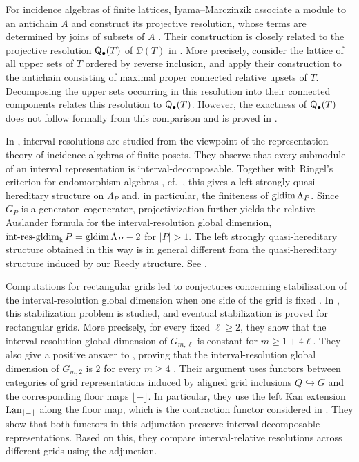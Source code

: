 For incidence algebras of finite lattices, Iyama--Marczinzik associate
a module to an antichain $A$ and construct its projective resolution,
whose terms are determined by joins of subsets of $A$
\cite[Theorem~2.2]{IM22}.
Their construction is closely related to the projective resolution
$\mathsf Q_\bullet(T)$ of $\DD(T)$ in
.
More precisely, consider the lattice of all upper sets of $T$ ordered
by reverse inclusion, and apply their construction to the
antichain consisting of maximal proper connected relative upsets of $T$.
Decomposing the upper sets occurring in this resolution into their
connected components relates this resolution to $\mathsf Q_\bullet(T)$.
However, the exactness of $\mathsf Q_\bullet(T)$ does not follow formally
from this comparison and is proved in
.


In \cite{AENY}, interval resolutions are studied from the viewpoint of
the representation theory of incidence algebras of finite posets.
They observe that every submodule of an interval representation
is interval-decomposable.  
Together with Ringel's criterion for endomorphism algebras
\cite{Ringel10}, cf.~\cite[Lemma~2.2]{Iyama03}, this gives a left
strongly quasi-hereditary structure on $\Lambda_P$ and, in particular,
the finiteness of $\operatorname{gldim}\Lambda_P$.  Since $G_P$ is a
generator--cogenerator, projectivization further yields
the relative Auslander formula for the interval-resolution global dimension,
$\operatorname{int\text{-}res\text{-}gldim}_{\mathsf{k}} P=\operatorname{gldim}\Lambda_P-2$ for $|P|>1$.
The left strongly quasi-hereditary structure obtained in this way is in
general different from the quasi-hereditary structure induced by our
Reedy structure.  See .


Computations for rectangular grids led to conjectures concerning stabilization of the interval-resolution global dimension when one side of the grid is fixed \cite[Conjectures~4.11 and~4.12]{AENY}.
In \cite{BDHS}, this stabilization problem is studied, and eventual stabilization is proved for rectangular
grids.  More precisely, for every fixed $\ell\geq2$, they show that the
interval-resolution global dimension of $G_{m,\ell}$ is constant for
$m\geq1+4\ell$.
They also give a positive answer to \cite[Conjecture~4.11]{AENY},
proving that the interval-resolution global dimension of $G_{m,2}$ 
is $2$ for every $m\geq4$ \cite[Corollary~D]{BDHS}.
Their argument uses functors between categories of grid representations
induced by aligned grid inclusions $Q\hookrightarrow G$ and the
corresponding floor maps $\lfloor-\rfloor$.
In particular, they use the left Kan extension $\operatorname{Lan}_{\lfloor-\rfloor}$ along the floor map, which is the contraction functor considered in \cite{BBH25}.
They show that both functors in this adjunction 
preserve interval-decomposable representations.
Based on this, they compare interval-relative resolutions across different grids using the adjunction. 

